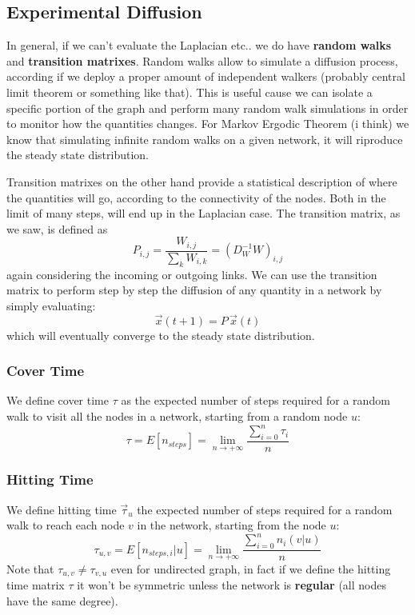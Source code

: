 \documentclass[12pt,a4paper]{article}
\begin{document}
\subsection{Experimental Diffusion}
In general, if we can't evaluate the Laplacian etc.. we do have \textbf{random walks} and \textbf{transition matrixes}. Random walks allow to simulate a diffusion process, according if we deploy a proper amount of independent walkers (probably central limit theorem or something like that). This is useful cause we can isolate a specific portion of the graph and perform many random walk simulations in order to monitor how the quantities changes.
For Markov Ergodic Theorem (i think) we know that simulating infinite random walks on a given network, it will riproduce the steady state distribution.

Transition matrixes on the other hand provide a statistical description of where the quantities will go, according to the connectivity of the nodes. Both in the limit of many steps, will end up in the Laplacian case.
The transition matrix, as we saw, is defined as
$$
P_{i,j} = \frac{W_{i,j}}{\sum_{k} W_{i,k}} = (D_W^{-1}W)_{i,j}
$$
again considering the incoming or outgoing links. We can use the transition matrix to perform step by step the diffusion of any quantity in a network by simply evaluating:
$$
\vec{x}(t+1) = P\,\vec{x}(t)
$$
which will eventually converge to the steady state distribution.

\subsubsection*{Cover Time}
We define cover time $\tau$ as the expected number of steps required for a random walk to visit all the nodes in a network, starting from a random node $u$:
$$
\tau = E[n_{steps}] = \lim_{n\rightarrow +\infty} \frac{\sum_{i=0}^{n} \tau_i}{n}
$$

\subsubsection*{Hitting Time}
We define hitting time $\vec{\tau}_u$ the expected number of steps required for a random walk to reach each node $v$ in the network, starting from the node $u$:
$$
\tau_{u,v} = E[n_{steps,i}|u] = \lim_{n\rightarrow +\infty} \frac{\sum_{i=0}^{n} n_{i}(v|u)}{n} 
$$
Note that $\tau_{u,v}\neq\tau_{v,u}$ even for undirected graph, in fact if we define the hitting time matrix $\tau$ it won't be symmetric unless the network is \textbf{regular} (all nodes have the same degree).
\end{document}
